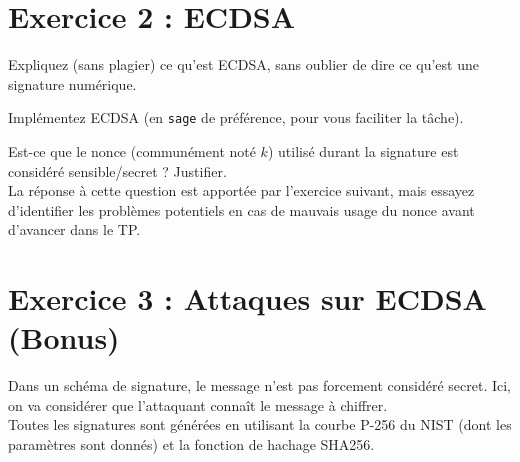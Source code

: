 \documentclass[french,a4paper,11pt]{exam}
\begin{document}
\section*{Exercice 2 : ECDSA}

\begin{questions}
  \question Expliquez (sans plagier) ce qu'est ECDSA, sans oublier de dire ce qu'est une signature numérique. 
  
  \question Implémentez ECDSA (en \texttt{sage} de préférence, pour vous faciliter la tâche).
  
  \question Est-ce que le nonce (communément noté $k$) utilisé durant la signature est considéré sensible/secret ? Justifier. \\
  La réponse à cette question est apportée par l'exercice suivant, mais essayez d'identifier les problèmes potentiels en cas de mauvais usage du nonce avant d'avancer dans le TP.
\end{questions}

\section*{Exercice 3 : Attaques sur ECDSA (Bonus)}

Dans un schéma de signature, le message n'est pas forcement considéré secret. Ici, on va considérer que l'attaquant connaît le message à chiffrer.\\
Toutes les signatures sont générées en utilisant la courbe P-256 du NIST (dont les paramètres sont donnés) et la fonction de hachage SHA256.
\end{document}
